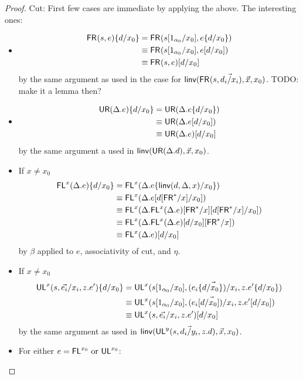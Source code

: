 \begin{proof}
Cut: First few cases are immediate by applying the above. The interesting ones:
\begin{itemize}
\item \begin{align*}
\mathsf{FR}_{}(s,e)\{d/x_0\}
&= {\mathsf{FR}_{}(s[1_{\alpha_0}/x_0],e\{d/x_0\})}\\
&\equiv {\ensuremath{\mathsf{FR}_{}(s[1_{\alpha_0}/x_0],e[d/x_0])}}\\
&\equiv \mathsf{FR}_{}(s,e)[d/x_0]
\end{align*}
by the same argument as used in the case for $\mathsf{linv}(\mathsf{FR}_{}(s,\vec{d_i/x_i}),\vec{x},x_0)$. TODO: make it a lemma then?
\item \begin{align*}
\mathsf{UR}(\Delta.e)\{d/x_0\} 
&= \mathsf{UR}(\Delta.e\{d/x_0\})\\
&\equiv \mathsf{UR}(\Delta.e[d/x_0])\\
&\equiv \mathsf{UR}(\Delta.e)[d/x_0] 
\end{align*}
by the same argument a used in $\mathsf{linv}(\mathsf{UR}(\Delta.d),\vec{x},x_0)$.
\item If $x \neq x_0$
\begin{align*}
\mathsf{FL}^{x}(\Delta.e)\{d/x_0\} 
&= \mathsf{FL}^{x}(\Delta.e\{\mathsf{linv}(d,\Delta,x)/x_0\}) \\
&\equiv \mathsf{FL}^{x}(\Delta.e[d[\mathsf{FR}^*/x]/x_0]) \\
&\equiv \mathsf{FL}^{x}(\Delta.\mathsf{FL}^{x}(\Delta.e)[\mathsf{FR}^*/x][d[\mathsf{FR}^*/x]/x_0]) \\
&\equiv \mathsf{FL}^{x}(\Delta.\mathsf{FL}^{x}(\Delta.e)[d/x_0][\mathsf{FR}^*/x]) \\
&\equiv \mathsf{FL}^{x}(\Delta.e)[d/x_0] 
\end{align*}
by $\beta$ applied to $e$, associativity of cut, and $\eta$.
\item If $x \neq x_0$
\begin{align*}
\mathsf{UL}^{x}_{}(s,\vec{e_i}/x_i,z.e')\{d/x_0\} 
&= {\mathsf{UL}^{x}_{}(s[1_{\alpha_0}/x_0],\vec{(e_i\{d/x_0\})/x_i},z.e'\{d/x_0\})} \\
&\equiv {\ensuremath{\mathsf{UL}^{x}_{}(s[1_{\alpha_0}/x_0],\vec{(e_i[d/x_0])/x_i},z.e'[d/x_0])}} \\
&\equiv \mathsf{UL}^{x}_{}(s,\vec{e_i}/x_i,z.e')[d/x_0] 
\end{align*}
by the same argument as used in $\mathsf{linv}(\mathsf{UL}^{y}_{}(s,\vec{d_i/y_i},z.d),\vec{x},x_0)$.
\item For either $e = \mathsf{FL}^{x_0} \text{ or } \mathsf{UL}^{x_0}$:

\end{itemize}
\end{proof}

